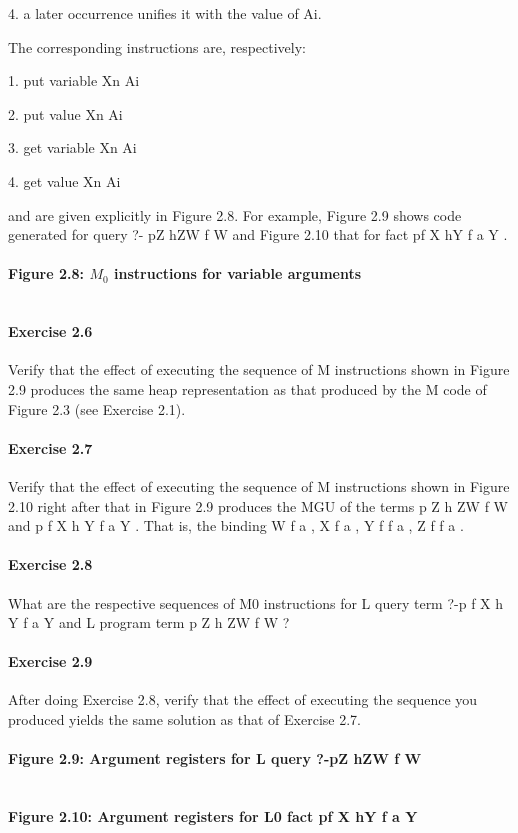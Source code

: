 4. a later occurrence unifies it with the value of Ai.

The corresponding instructions are, respectively:

1. put variable Xn
Ai

2. put value Xn
Ai

3. get variable Xn
Ai

4. get value Xn
Ai

and are given explicitly in Figure 2.8. For example, Figure 2.9 shows code
generated for query ?- pZ hZW f W and Figure 2.10 that for fact pf X hY f a
Y .

\paragraph{Figure 2.8: $M_0$ instructions for variable arguments}
\begin{verbatim}

\end{verbatim}

\paragraph{Exercise 2.6} Verify that the effect of executing the sequence of M
instructions shown in Figure 2.9 produces the same heap representation as that produced by
the M code of Figure 2.3 (see Exercise 2.1).

\paragraph{Exercise 2.7} Verify that the effect of executing the sequence of M
instructions shown in Figure 2.10 right after that in Figure 2.9 produces the MGU of the
terms p Z h ZW  f  W   and p f  X  h Y f  a   Y  . That is, the binding W
 f  a , X f  a , Y f  f  a  , Z f  f  a  .
 
\paragraph{Exercise 2.8} What are the respective sequences of M0 instructions
for L query term ?-p f  X  h Y f  a   Y   and L program term p Z h ZW  f  W  ?

\paragraph{Exercise 2.9} After doing Exercise 2.8, verify that the effect of
executing the sequence you produced yields the same solution as that of Exercise 2.7.

\paragraph{Figure 2.9: Argument registers for L query ?-pZ hZW f W}
\begin{verbatim}

\end{verbatim}

\paragraph{Figure 2.10: Argument registers for L0 fact pf X hY f a Y }
\begin{verbatim}

\end{verbatim}